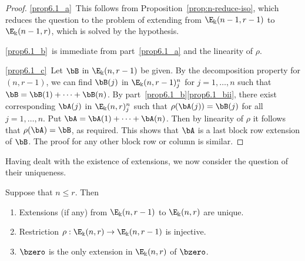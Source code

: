 \begin{proof}
\ref{prop6.1_a}~This follows from Proposition~\ref{prop:n-reduce-iso}, which
 reduces the question to the problem of extending from
 $\E_\Bbbk(n-1,r-1)$ to $\E_\Bbbk(n-1,r)$, which is solved by the
 hypothesis.

\ref{prop6.1_b}~is immediate from part~\ref{prop6.1_a} and the linearity of $\rho$.

\ref{prop6.1_c}~Let $\bB$ in $\E_\Bbbk(n,r-1)$ be given. By the decomposition
 property for $(n,r-1)$, we can find $\bB(j)$ in
 $\E_\Bbbk(n,r-1)^n_j$ for $j = 1, \dots, n$ such that $\bB = \bB(1)
 + \cdots + \bB(n)$. By part~\ref{prop6.1_b}\ref{prop6.1_bii}, there exist corresponding
 $\bA(j)$ in $\E_\Bbbk(n,r)^n_j$ such that $\rho(\bA(j)) = \bB(j)$
 for all $j = 1, \dots, n$. Put $\bA = \bA(1) + \cdots +
 \bA(n)$. Then by linearity of $\rho$ it follows that $\rho(\bA) =
 \bB$, as required. This shows that $\bA$ is a last block row
 extension of $\bB$. The proof for any other block row or column is
 similar.
\end{proof}

Having dealt with the existence of extensions, we now consider the
question of their uniqueness.

\begin{lemm}\label{lem:rho-injects}
 Suppose that $n \le r$. Then
 \begin{enumerate}[label=(\alph*)]
 \item\label{lemma6.2_a} Extensions \textup{(}if any\textup{)} from $\E_\Bbbk(n,r-1)$
 to $\E_\Bbbk(n,r)$ are unique.
 \item\label{lemma6.2_b} Restriction $\rho: \E_\Bbbk(n,r) \to \E_\Bbbk(n,r-1)$ is
 injective.
 \item\label{lemma6.2_c} $\bzero$ is the only extension in $\E_\Bbbk(n,r)$ of $\bzero$.
 \end{enumerate}
\end{lemm}

